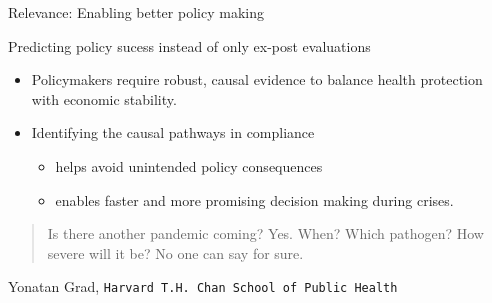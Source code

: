 \documentclass[
  ignorenonframetext,
]{beamer}
\providecommand{\tightlist}{%
  \setlength{\itemsep}{0pt}\setlength{\parskip}{0pt}}\usepackage{longtable,booktabs,array}
\begin{document}
\begin{frame}[fragile]
\begin{block}{Relevance: Enabling better policy making}
\label{relevance-enabling-better-policy-making}
\begin{block}{Predicting policy sucess instead of only ex-post
evaluations}
\label{predicting-policy-sucess-instead-of-only-ex-post-evaluations}
\begin{itemize}
\tightlist
\item
  Policymakers require robust, causal evidence to balance health
  protection with economic stability.
\item
  Identifying the causal pathways in compliance

  \begin{itemize}
  \tightlist
  \item
    helps avoid unintended policy consequences
  \item
    enables faster and more promising decision making during crises.
  \end{itemize}
\end{itemize}

\begin{quote}
Is there another pandemic coming? Yes. When? Which pathogen? How severe
will it be? No one can say for sure.
\end{quote}

Yonatan Grad, \texttt{Harvard\ T.H.\ Chan\ School\ of\ Public\ Health}
\end{block}
\end{block}
\end{frame}
\end{document}
